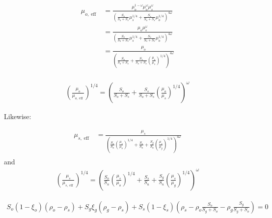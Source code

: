 \documentclass[11pt, a4paper]{article}
\DeclareMathOperator{\eff}{eff}
\begin{document}
\begin{align*}
  \mu_{o,\eff}
  & = \frac{\mu_o^{1-\omega}\mu_o^\omega\mu_s^\omega}{\left(\frac{S_o}{S_o + S_s}\mu_s^{1/4} + \frac{S_s}{S_o + S_s}\mu_o^{1/4}\right)^{4\omega}} \\
  & = \frac{\mu_o\mu_s^\omega}{\left(\frac{S_o}{S_o + S_s}\mu_s^{1/4} + \frac{S_s}{S_o + S_s}\mu_o^{1/4}\right)^{4\omega}} \\
  & = \frac{\mu_o}{\left(\frac{S_o}{S_o + S_s} + \frac{S_s}{S_o + S_s}\left(\frac{\mu_o}{\mu_s}\right)^{1/4}\right)^{4\omega}} \\
\end{align*}

\begin{align*}
  \left(\frac{\mu_o}{\mu_{o,\eff}}\right)^{1/4} = \left(\frac{S_o}{S_o + S_s} + \frac{S_s}{S_o + S_s}\left(\frac{\mu_o}{\mu_s}\right)^{1/4}\right)^{\omega}
\end{align*}

Likewise:

\begin{align*}
  \mu_{s,\eff}
  & = \frac{\mu_s}{\left(\frac{S_o}{S_n} \left(\frac{\mu_s}{\mu_o}\right)^{1/4}+ \frac{S_s}{S_n} + \frac{S_g}{S_n}\left(\frac{\mu_s}{\mu_g}\right)^{1/4}\right)^{4\omega}} \\
\end{align*}
and
\begin{align*}
  \left(\frac{\mu_s}{\mu_{s,\eff}}\right)^{1/4} = \left(\frac{S_o}{S_n} \left(\frac{\mu_s}{\mu_o}\right)^{1/4}+ \frac{S_s}{S_n} + \frac{S_g}{S_n}\left(\frac{\mu_s}{\mu_g}\right)^{1/4}\right)^{\omega}
\end{align*}




\begin{align*}
  S_o(1-\xi_o)(\rho_o - \rho_s) + S_g\xi_g(\rho_g - \rho_s) + S_s(1-\xi_s)\left(\rho_s - \rho_o \frac{S_o}{S_g + S_o} - \rho_g \frac{S_g}{S_g + S_o}\right) = 0
\end{align*}

\begin{small}
  
\end{small}
\end{document}
